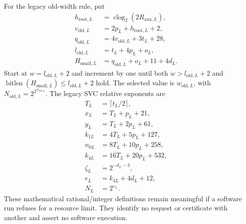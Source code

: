 \documentclass[11pt]{article}
\theoremstyle{plain}
\theoremstyle{definition}
\theoremstyle{remark}
\begin{document}
For the legacy old-width rule, put
\begin{align*}
 h_{\mathrm{root},L}&=\operatorname{clog}_2(2R_{\mathrm{aux},L}),\\
 v_{\mathrm{old},L}&=2p_L+h_{\mathrm{root},L}+2,\\
 q_{\mathrm{old},L}&=4v_{\mathrm{old},L}+3t_L+28,\\
 l_{\mathrm{old},L}&=t_L+4p_L+o_L,\\
 H_{\mathrm{small},L}&=q_{\mathrm{old},L}+o_L+11+4d_L.
\end{align*}
Start at $w=l_{\mathrm{old},L}+2$ and increment by one until both
$w>l_{\mathrm{old},L}+2$ and
$\operatorname{bitlen}(H_{\mathrm{small},L})\le l_{\mathrm{old},L}+2$ hold.
The selected value is $w_{\mathrm{old},L}$, with
$N_{\mathrm{old},L}=2^{2^{w_{\mathrm{old},L}}}$. The legacy SVC relative
exponents are
\begin{align*}
 T_L&=\lceil t_L/2\rceil,\\
 x_L&=T_L+p_L+21,\\
 y_L&=T_L+2p_L+61,\\
 k_{1L}&=4T_L+5p_L+127,\\
 n_{0L}&=8T_L+10p_L+258,\\
 k_{4L}&=16T_L+20p_L+532,\\
 \zeta_L&=2^{-d_L-3},\\
 e_L&=k_{4L}+4d_L+12,\\
 N_L&=2^{e_L}.
\end{align*}
These mathematical rational/integer definitions remain meaningful if a
software run refuses for a resource limit. They identify no request or
certificate with another and assert no software execution.

\end{document}
